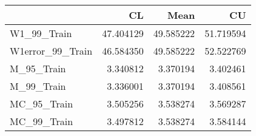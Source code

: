 \begin{tabular}{lrrr}
\toprule
{} &         CL &       Mean &         CU \\
\midrule
W1\_99\_Train      &  47.404129 &  49.585222 &  51.719594 \\
W1error\_99\_Train &  46.584350 &  49.585222 &  52.522769 \\
M\_95\_Train       &   3.340812 &   3.370194 &   3.402461 \\
M\_99\_Train       &   3.336001 &   3.370194 &   3.408561 \\
MC\_95\_Train      &   3.505256 &   3.538274 &   3.569287 \\
MC\_99\_Train      &   3.497812 &   3.538274 &   3.584144 \\
\bottomrule
\end{tabular}

